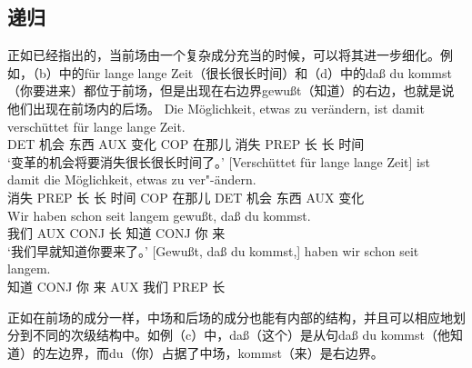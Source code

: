 \subsection{递归}
\label{sec-topo-rekursion}
正如\citet[]{Reis80a}已经指出的，当前场由一个复杂成分充当的时候，可以将其进一步细化。例如，（b）中的für lange lange Zeit（很长很长时间）和（d）中的daß du kommst（你要进来）都位于前场，但是出现在右边界gewußt（知道）的右边，也就是说他们出现在前场内的后场。
\eal
\label{Beispiel-topologisch-komplexes-Vorfeld}
\ex
\gll Die Möglichkeit, etwas zu verändern, ist damit verschüttet für lange lange Zeit.\\
	 DET 机会 东西 AUX 变化 COP 在那儿 消失 PREP 长 长 时间\\
\glt `变革的机会将要消失很长很长时间了。'	  
\ex 
\gll {}[Verschüttet für lange lange Zeit] ist damit die Möglichkeit,      etwas zu ver"-ändern.\\
      \spacebr{}消失 PREP 长 长 时间 COP 在那儿 DET 机会  东西 AUX 变化\\
\ex 
\gll Wir haben schon seit langem gewußt, daß du kommst.\\
     我们 AUX \particle{} CONJ 长 知道 CONJ 你 来\\
\glt `我们早就知道你要来了。'
\ex 
\gll {}[Gewußt, daß du kommst,] haben wir schon seit langem.\\
	 \spacebr{}知道 CONJ 你 来 AUX 我们 \particle{} PREP 长\\
\zl


\noindent
正如在前场的成分一样，中场和后场的成分也能有内部的结构，并且可以相应地划分到不同的次级结构中。如例（c）中，daß（这个）是从句daß du kommst（他知道）的左边界，而du（你）占据了中场，kommst（来）是右边界。


